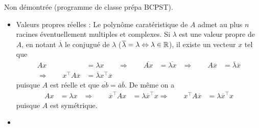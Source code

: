 \proof
Non démontrée (programme de classe prépa BCPST). \\
\begin{itemize}
  \item Valeurs propres réelles : Le polynôme caratéristique de $A$ admet au plus $n$ racines éventuellement multiples et complexes. Si $\lambda$ est une valeur propre de $A$, en notant $\overline{\lambda}$ le conjugué de $\lambda$ ($\overline{\lambda} = \lambda \Leftrightarrow \lambda \in \mathbb{R}$), il existe un vecteur $x$ tel que
  \begin{align*}
    Ax & = \lambda x & 
    \Rightarrow \qquad \overline{Ax} & = \overline{\lambda x} &
    \Rightarrow \qquad A \overline{x} & = \overline{\lambda} \overline{x} \\
    \Rightarrow \qquad x^\top A \overline{x} & = \overline{\lambda} x^\top \overline{x}
  \end{align*}
  puisque $A$ est réelle et que $\overline{a b} = \overline{a} \overline{b}$. De même on a
  \begin{align*}
    Ax & = \lambda x & 
    \Rightarrow \qquad \overline{x}^\top A x & = \lambda \overline{x}^\top x
    \Rightarrow \qquad x^\top A \overline{x} & = \lambda \overline{x}^\top x
  \end{align*}
  puisque $A$ est symétrique.
  \item \todo{}
\end{itemize}
\eproof
